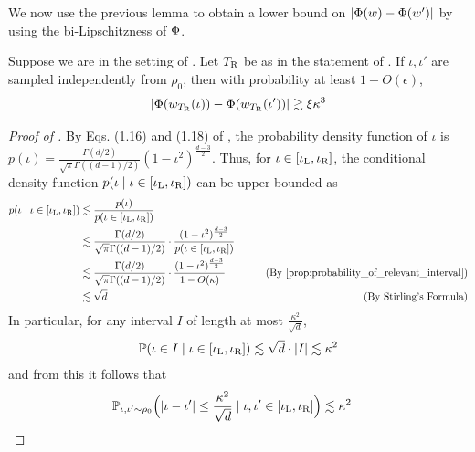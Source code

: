 We now use the previous lemma to obtain a lower bound on $|\Phi(w) - \Phi(w')|$ by using the bi-Lipschitzness of $\Phi$.

\begin{lemma} \label{lemma:case_1_initial_potential}
Suppose we are in the setting of . Let ${T_{\textup{R}}}$ be as in the statement of . If $\iota, \iota'$ are sampled independently from $\rho_0$, then with probability at least $1 - O(\epsilon)$,
\begin{align}
|\Phi(w_{{T_{\textup{R}}}}(\iota)) - \Phi(w_{{T_{\textup{R}}}}(\iota'))| \gtrsim \xi \kappa^3
\end{align}
\end{lemma}
\begin{proof}[Proof of ]
By Eqs. (1.16) and (1.18) of \citet{atkinson2012spherical}, the probability density function of $\iota$ is $p(\iota) = \frac{\Gamma(d/2)}{\sqrt{\pi} \Gamma((d - 1)/2)} (1 - \iota^2)^{\frac{d - 3}{2}}$. Thus, for $\iota \in [\iota_{\textup{L}}, \iota_{\textup{R}}]$, the conditional density function $p(\iota \mid \iota \in [\iota_{\textup{L}}, \iota_{\textup{R}}])$ can be upper bounded as
\begin{align}
p(\iota \mid \iota \in [\iotaL, \iotaR])
& \lesssim \frac{p(\iota)}{p(\iota \in [\iotaL, \iotaR])} \\
& \lesssim \frac{\Gamma(d/2)}{\sqrt{\pi} \Gamma((d - 1)/2)} \cdot \frac{(1 - \iota^2)^{\frac{d - 3}{2}}}{p(\iota \in [\iotaL, \iotaR])} \\
& \lesssim \frac{\Gamma(d/2)}{\sqrt{\pi} \Gamma((d - 1)/2)} \cdot \frac{(1 - \iota^2)^{\frac{d - 3}{2}}}{1 - O(\kappa)}
& \tag{By \Cref{prop:probability_of_relevant_interval}} \\
& \lesssim \sqrt{d}
& \tag{By Stirling's Formula}
\end{align}
In particular, for any interval $I$ of length at most $\frac{\kappa^2}{\sqrt{d}}$,
\begin{align}
\mathbb{P}(\iota \in I \mid \iota \in [\iota_{\textup{L}}, \iota_{\textup{R}}]) 
\lesssim \sqrt{d} \cdot |I| 
\lesssim \kappa^2
\end{align}
and from this it follows that
\begin{align} \label{eq:probability_of_close_pairs}
\mathbb{P}_{\iota, \iota' \sim \rho_0}\Big( |\iota - \iota'| \leq \frac{\kappa^2}{\sqrt{d}} \mid \iota, \iota' \in [\iota_{\textup{L}}, \iota_{\textup{R}}]\Big)
& \lesssim \kappa^2
\end{align}


\end{proof}
